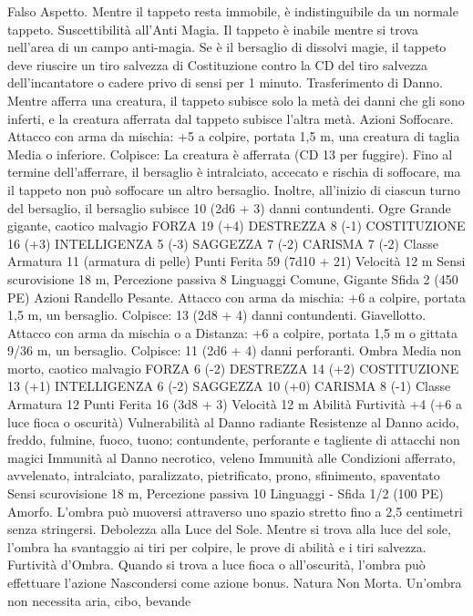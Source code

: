 \begin{multicols}{2}
Falso Aspetto. Mentre il tappeto resta immobile, è indistinguibile
da un normale tappeto.
Suscettibilità all’Anti Magia. Il tappeto è inabile mentre si trova
nell’area di un campo anti-magia. Se è il bersaglio di dissolvi
magie, il tappeto deve riuscire un tiro salvezza di Costituzione
contro la CD del tiro salvezza dell’incantatore o cadere privo di
sensi per 1 minuto.
Trasferimento di Danno. Mentre afferra una creatura, il tappeto
subisce solo la metà dei danni che gli sono inferti, e la creatura
afferrata dal tappeto subisce l’altra metà.
Azioni
Soffocare. Attacco con arma da mischia: +5 a colpire, portata
1,5 m, una creatura di taglia Media o inferiore.
Colpisce: La creatura è afferrata (CD 13 per fuggire). Fino al
termine dell’afferrare, il bersaglio è intralciato, accecato e rischia
di soffocare, ma il tappeto non può soffocare un altro bersaglio.
Inoltre, all’inizio di ciascun turno del bersaglio, il bersaglio
subisce 10 (2d6 + 3) danni contundenti.
Ogre
Grande gigante, caotico malvagio
FORZA 19 (+4)
DESTREZZA 8 (-1)
COSTITUZIONE 16 (+3)
INTELLIGENZA 5 (-3)
SAGGEZZA 7 (-2)
CARISMA 7 (-2)
Classe Armatura 11 (armatura di pelle)
Punti Ferita 59 (7d10 + 21)
Velocità 12 m
Sensi scurovisione 18 m, Percezione passiva 8
Linguaggi Comune, Gigante
Sfida 2 (450 PE)
Azioni
Randello Pesante. Attacco con arma da mischia: +6 a colpire,
portata 1,5 m, un bersaglio.
Colpisce: 13 (2d8 + 4) danni contundenti.
Giavellotto. Attacco con arma da mischia o a Distanza: +6 a
colpire, portata 1,5 m o gittata 9/36 m, un bersaglio.
Colpisce: 11 (2d6 + 4) danni perforanti.
Ombra
Media non morto, caotico malvagio
FORZA 6 (-2)
DESTREZZA 14 (+2)
COSTITUZIONE 13 (+1)
INTELLIGENZA 6 (-2)
SAGGEZZA 10 (+0)
CARISMA 8 (-1)
Classe Armatura 12
Punti Ferita 16 (3d8 + 3)
Velocità 12 m
Abilità Furtività +4 (+6 a luce fioca o oscurità)
Vulnerabilità al Danno radiante
Resistenze al Danno acido, freddo, fulmine, fuoco, tuono;
contundente, perforante e tagliente di attacchi non magici
Immunità al Danno necrotico, veleno
Immunità alle Condizioni afferrato, avvelenato, intralciato,
paralizzato, pietrificato, prono, sfinimento, spaventato
Sensi scurovisione 18 m, Percezione passiva 10
Linguaggi -
Sfida 1/2 (100 PE)
Amorfo. L’ombra può muoversi attraverso uno spazio stretto
fino a 2,5 centimetri senza stringersi.
Debolezza alla Luce del Sole. Mentre si trova alla luce del sole,
l’ombra ha svantaggio ai tiri per colpire, le prove di abilità e i tiri
salvezza.
Furtività d’Ombra. Quando si trova a luce fioca o all’oscurità,
l’ombra può effettuare l’azione Nascondersi come azione bonus.
Natura Non Morta. Un’ombra non necessita aria, cibo, bevande

\end{multicols}
